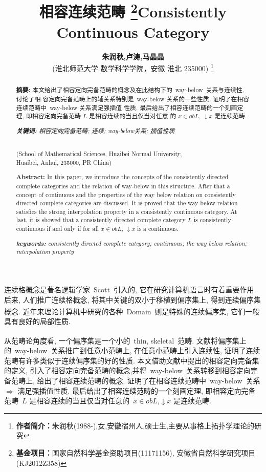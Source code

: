\documentclass[c5size,a4paper,hyperref,fancyhdr,UTF8,fontset=fandol]{ctexart}
\title{ \songti\textbf{相容连续范畴}
    \thanks{ \textbf{基金项目：}国家自然科学基金资助项目(11171156), 安徽省自然科学研究项目(KJ2012Z358) }}
\author{ \songti\textbf{朱润秋,卢涛,马晶晶}\\
    (淮北师范大学 数学科学学院，安徽 淮北  235000)
    \thanks { \textbf{作者简介：}朱润秋(1988-),女,安徽宿州人,硕士生,主要从事格上拓扑学理论的研究 }}
\date{}
\theoremstyle{nonumberplain}
\theoremstyle{nonumberplain}
\newcommand{\upcite}[1]{\textsuperscript{\cite{#1}}}
\begin{document}
\maketitle

\begin{abstract}
\noindent \textbf{摘要: }本文给出了相容定向完备范畴的概念及在此结构下的~way-below~关系与连续性, 讨论了相
容定向完备范畴上的辅关系特别是~way-below 关系的一些性质, 证明了在相容连续范畴中~way-below 关系满足强插值
性质. 最后给出了相容连续范畴的一个刻画定理, 即相容定向完备范畴 $L$ 是相容连续的当且仅当对任意
的 $x\in obL$, $\downarrow x$ 是连续范畴.

\noindent \textit{\textbf{关键词: }相容定向完备范畴; 连续; way-below关系; 插值性质}
\end{abstract}

\begin{abstract}
\begin{center}
  \title{\textbf{Consistently Continuous Category}}
  \\(School of Mathematical Sciences, Huaibei Normal University,
  \\Huaibei, Anhui, 235000, PR China)
\end{center}

\noindent \textbf{Abstract:} In this paper, we introduce the concepts of the consistently directed complete categories and the relation of way-below in this structure. After that a concept of continuous and the properties of the way below relation on consistently directed complete categories are discussed. It is proved that the way-below relation satisfies the strong interpolation property in a consistently continuous category. At last, it is showed that a consistently directed complete category $L$ is consistently continuous if and only if for all $x\in obL$, $\downarrow x$ is a continuous.

\noindent \textit{\textbf{keywords: }consistently directed complete category; continuous; the way below relation; interpolation property}
\end{abstract}

连续格概念是著名逻辑学家~Scott~引入的, 它在研究计算机语言时有着重要作用. 后来, 人们推广连续格概念, 将其中关键的双小于移植到偏序集上, 得到连续偏序集概念\upcite{r1,r2}. 近年来理论计算机中研究的各种~Domain~则是特殊的连续偏序集, 它们一般具有良好的局部性质.

从范畴论角度看, 一个偏序集是一个小的~thin, skeletal~范畴\upcite{r3}. 文献\cite{r4}将偏序集上的~way-below~关系推广到任意小范畴上,
在任意小范畴上引入连续性, 证明了连续范畴有许多类似于连续偏序集的好的性质.
本文借助文献\cite{r5}中提出的相容定向完备集的定义, 引入了相容定向完备范畴的概念,并将~way-below~关系转移到相容定向完备范畴上,
给出了相容连续范畴的概念. 证明了在相容连续范畴中~way-below~关系 $\Rightarrow$ 满足强插值性质.
最后给出了相容连续范畴的一个刻画定理, 即相容定向完备范畴~$L$ 是相容连续的当且仅当对任意的~$x\in obL$,$\downarrow x$ 是连续范畴.
\end{document}
